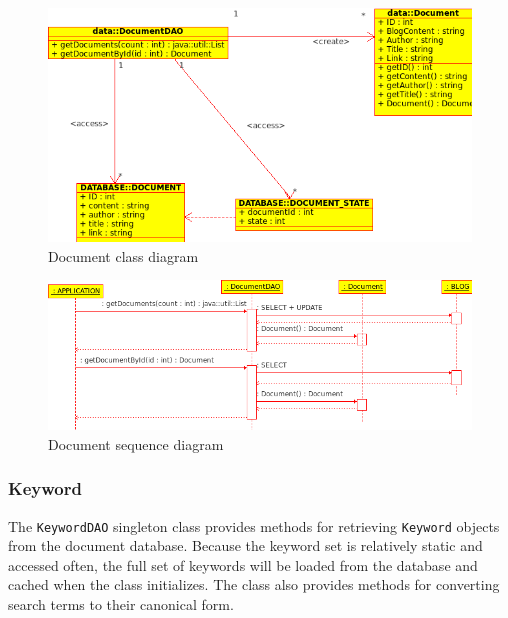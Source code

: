 \documentclass[10pt]{report}
\begin{document}
\begin{figure}
  \begin{center}
	\includegraphics[width=\textwidth,height=!]{documentclassdiagram}
  \end{center}
  \caption{Document class diagram}
  \label{fig:documentclassdiagram}
\end{figure} 

\begin{figure}
  \begin{center}
	\includegraphics[width=\textwidth,height=!]{documentsequencediagram}
  \end{center}
  \caption{Document sequence diagram}
  \label{fig:documentsequencediagram}
\end{figure} 


\subsubsection{Keyword}
The \texttt{KeywordDAO} singleton class provides methods for
retrieving \texttt{Keyword} objects from the document
database. Because the keyword set is relatively static and accessed
often, the full set of keywords will be loaded from the database and
cached when the class initializes. The class also provides methods for
converting search terms to their canonical form.
\end{document}
